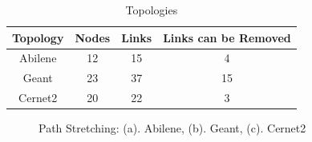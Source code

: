 \documentclass[conference]{IEEEtran}
\begin{document}
\begin{table}[!t]
\renewcommand{\arraystretch}{1}
\caption{Topologies}
\label{three topologies}
\centering
\begin{tabular}{|c|c|c|c|}
\hline
\bfseries Topology & \bfseries Nodes & \bfseries Links & \bfseries Links can be Removed \\
\hline
Abilene & 12 & 15 & 4 \\
\hline
Geant & 23 & 37 & 15 \\
\hline
Cernet2 & 20 & 22 & 3 \\
\hline
\end{tabular}
\end{table}


\begin{figure}[!t]
\centering
\vspace*{0.1in}
\caption{Path Stretching: (a). Abilene, (b). Geant, (c). Cernet2}
\vspace*{0.1in}
\end{figure}
\end{document}
